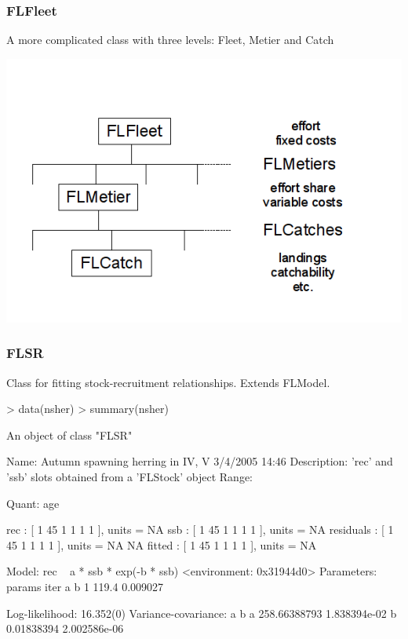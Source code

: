 \documentclass{beamer}%
\begin{document}
\begin{frame}
  \frametitle{FLFleet}
A more complicated class with three levels: Fleet, Metier and Catch
   \begin{center}
      \includegraphics[width=1\textwidth]{FLFleet.png}
   \end{center}
\end{frame}

%
\begin{frame}[containsverbatim]
  \frametitle{FLSR}
Class for fitting stock-recruitment relationships.  Extends FLModel.
{\tiny{
\begin{Schunk}
\begin{Sinput}
> data(nsher)
> summary(nsher)
\end{Sinput}
\begin{Soutput}
An object of class "FLSR"

Name: Autumn spawning herring in IV, V  3/4/2005 14:46 
Description: 'rec' and 'ssb' slots obtained from a 'FLStock' object 
Range:	  
		
Quant: age 

rec           : [ 1 45 1 1 1 1 ], units =  NA 
ssb           : [ 1 45 1 1 1 1 ], units =  NA 
residuals     : [ 1 45 1 1 1 1 ], units =  NA NA 
fitted        : [ 1 45 1 1 1 1 ], units =  NA 

Model: 	rec ~ a * ssb * exp(-b * ssb)
<environment: 0x31944d0>
Parameters: 
    params
iter     a        b
   1 119.4 0.009027

Log-likelihood:  16.352(0) 
Variance-covariance:    
               a            b
  a 258.66388793 1.838394e-02
  b   0.01838394 2.002586e-06
\end{Soutput}
\end{Schunk}
}}
\end{frame}
\end{document}
